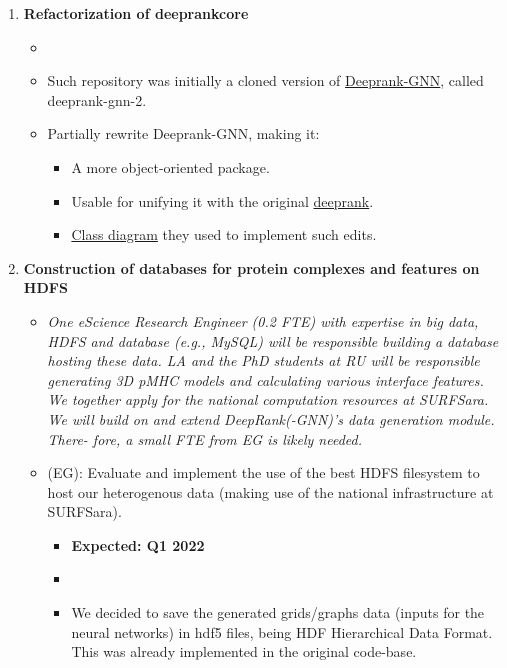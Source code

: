 \begin{enumerate}[start=0,leftmargin=.7in,label={\bfseries \ding{118} Task \arabic*:}]%
\item  \textbf{Refactorization of deeprankcore}
    \begin{itemize}[label=]
    \item {}
    \item Such repository was initially a cloned version of
    \href{https://github.com/DeepRank/Deeprank-GNN}{Deeprank-GNN}, called deeprank-gnn-2.
    \item Partially rewrite Deeprank-GNN, making it:
    \begin{itemize}
        \item A more object-oriented package.
        \item Usable for unifying it with the original \href{https://github.com/DeepRank/deeprank}{deeprank}.
        \item \href{https://drive.google.com/file/d/17Nw5mOpYzyp3uL225OTZNCHz8QVMY2aF/view?usp=share_link}{Class diagram} they used to implement such edits.
        \end{itemize}
    \end{itemize}
\item \textbf{Construction of databases for protein complexes and features on HDFS}
    \begin{itemize}[label=]
        \item \textit{One eScience Research Engineer (0.2 FTE) with expertise in big data, HDFS and database (e.g., MySQL) will be
    responsible building a database hosting these data. LA and the PhD students at RU will be responsible generating 3D
    pMHC models and calculating various interface features. We together apply for the national computation resources at
    SURFSara. We will build on and extend DeepRank(-GNN)'s data generation module. There- fore, a small FTE from EG is
    likely needed.}
        \item (EG): Evaluate and implement the use of the best HDFS filesystem to host our heterogenous data (making use of the
    national infrastructure at SURFSara).
        \begin{itemize}
            \item \textbf{Expected: Q1 2022}
            \item {}
            \item We decided to save the generated grids/graphs data (inputs for the neural networks) in hdf5 files, being HDF Hierarchical Data Format. This was already implemented in the original code-base.

\end{itemize}
\end{itemize}
\end{enumerate}
